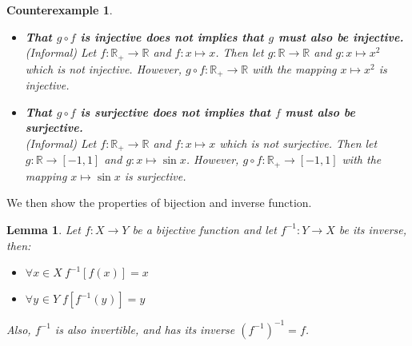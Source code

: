 \documentclass[a4paper]{book}
\theoremstyle{break}
\newtheorem{counterexample}{\hspace{-30pt}\protect\dbend\hspace{15pt}Counterexample}[section]
\newtheorem{lemma}{Lemma}[section]
\begin{document}
			\begin{counterexample}
				\begin{itemize}
					\item \textbf{That $g\circ f$ is injective does not implies that $g$ must also be injective.}\\
					(Informal) Let $f:\mathbb{R}_+\to\mathbb{R}$ and $f:x\mapsto x$. Then let $g:\mathbb{R}\to\mathbb{R}$ and $g:x\mapsto x^2$ which is not injective. However, $g\circ f:\mathbb{R}_+\to\mathbb{R}$ with the mapping $x\mapsto x^2$ is injective.
					\item \textbf{That $g\circ f$ is surjective does not implies that $f$ must also be surjective.}\\
					(Informal) Let $f:\mathbb{R}_+\to\mathbb{R}$ and $f:x\mapsto x$ which is not surjective. Then let $g:\mathbb{R}\to[-1,1]$ and $g:x\mapsto\sin x$. However, $g\circ f:\mathbb{R}_+\to[-1,1]$ with the mapping $x\mapsto\sin x$ is surjective.
				\end{itemize}
			\end{counterexample}
			We then show the properties of bijection and inverse function.
			\begin{lemma}
				\label{bijection and inverse function}
				Let $f:X\to Y$ be a bijective function and let $f^{-1}:Y\to X$ be its inverse, then:
				\begin{itemize}
					\item $\forall x\in X~f^{-1}[f(x)]=x$
					\item $\forall y\mspace{1mu}\in Y\mspace{1mu}~f[f^{-1}(y\mspace{1mu})]=y$
				\end{itemize}
				Also, $f^{-1}$ is also invertible, and has its inverse $(f^{-1})^{-1}=f$.
			\end{lemma}
\end{document}
